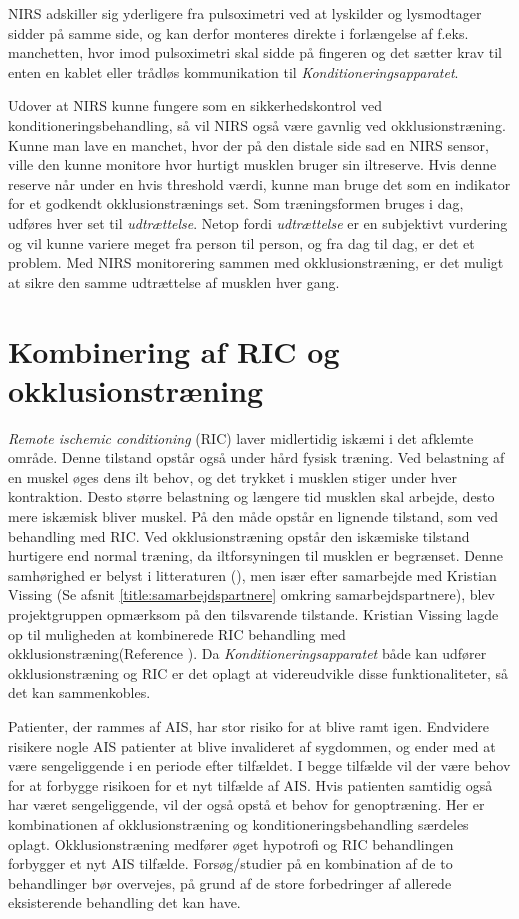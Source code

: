 NIRS adskiller sig yderligere fra pulsoximetri ved at lyskilder og lysmodtager sidder på samme side, og kan derfor monteres direkte i forlængelse af f.eks. manchetten, hvor imod pulsoximetri skal sidde på fingeren og det sætter krav til enten en kablet eller trådløs kommunikation til \textit{Konditioneringsapparatet}. 

Udover at NIRS kunne fungere som en sikkerhedskontrol ved konditioneringsbehandling, så vil NIRS også være gavnlig ved okklusionstræning. Kunne man lave en manchet, hvor der på den distale side sad en NIRS sensor, ville den kunne monitore hvor hurtigt musklen bruger sin iltreserve. Hvis denne reserve når under en hvis threshold værdi, kunne man bruge det som en indikator for et godkendt okklusionstrænings set. Som træningsformen bruges i dag, udføres hver set til \textit{udtrættelse}. Netop fordi \textit{udtrættelse} er en subjektivt vurdering og vil kunne variere meget fra person til person, og fra dag til dag, er det et problem. Med NIRS monitorering sammen med okklusionstræning, er det muligt at sikre den samme udtrættelse af musklen hver gang. 

\section{Kombinering af RIC og okklusionstræning} \label{title:kombRICogOkkl}
\textit{Remote ischemic conditioning} (RIC) laver midlertidig iskæmi i det afklemte område. Denne tilstand opstår også under hård fysisk træning. Ved belastning af en muskel øges dens ilt behov, og det trykket i musklen stiger under hver kontraktion. Desto større belastning og længere tid musklen skal arbejde, desto mere iskæmisk bliver muskel. På den måde opstår en lignende tilstand, som ved behandling med RIC. Ved okklusionstræning opstår den iskæmiske tilstand hurtigere end normal træning, da iltforsyningen til musklen er begrænset. Denne samhørighed er belyst i litteraturen (\cite{RefWorks:3}), men især efter samarbejde med Kristian Vissing (Se afsnit \ref{title:samarbejdspartnere} omkring samarbejdspartnere), blev projektgruppen opmærksom på den tilsvarende tilstande. Kristian Vissing lagde op til muligheden at kombinerede RIC behandling med okklusionstræning(Reference ). Da \textit{Konditioneringsapparatet} både kan udfører okklusionstræning og RIC er det oplagt at videreudvikle disse funktionaliteter, så det kan sammenkobles. 

Patienter, der rammes af AIS, har stor risiko for at blive ramt igen. Endvidere risikere nogle AIS patienter at blive invalideret af sygdommen, og ender med at være sengeliggende i en periode efter tilfældet. I begge tilfælde vil der være behov for at forbygge risikoen for et nyt tilfælde af AIS. Hvis patienten samtidig også har været sengeliggende, vil der også opstå et behov for genoptræning. Her er kombinationen af okklusionstræning og konditioneringsbehandling særdeles oplagt. Okklusionstræning medfører øget hypotrofi og RIC behandlingen forbygger et nyt AIS tilfælde. Forsøg/studier på en kombination af de to behandlinger bør overvejes, på grund af de store  forbedringer af allerede eksisterende behandling det kan have. 

